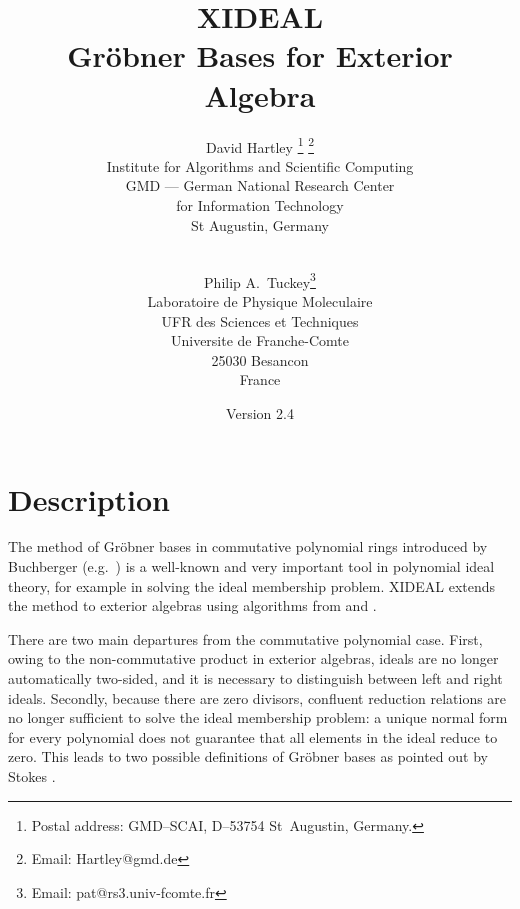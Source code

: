 
\title{\bf XIDEAL\\
Gr{\"o}bner Bases for Exterior Algebra}

\author{
David Hartley
 \thanks{Postal address: GMD--SCAI, D--53754 St~Augustin, Germany.}
 \thanks{Email: Hartley@gmd.de}				\\
Institute for Algorithms and Scientific Computing	\\
GMD --- German National Research Center			\\
for Information Technology				\\
St Augustin, Germany					\\
\\ \and
Philip A.~Tuckey\thanks{Email: pat@rs3.univ-fcomte.fr}	\\
Laboratoire de Physique Moleculaire			\\
UFR des Sciences et Techniques				\\
Universite de Franche-Comte				\\
25030 Besancon						\\
France							
}

\date{Version 2.4}


\maketitle

\section{Description}

The method of Gr{\"o}bner bases in commutative polynomial rings introduced by
Buchberger (e.g.~\cite{Buchberger}) is a well-known and very important tool
in polynomial ideal theory, for example in solving the ideal membership
problem. XIDEAL extends the method to exterior algebras using
algorithms from \cite{HT} and \cite{Apel}.

There are two main departures from the commutative polynomial case. First,
owing to the non-commutative product in exterior algebras, ideals are no
longer automatically two-sided, and it is necessary to distinguish between
left and right ideals. Secondly, because there are zero divisors, confluent
reduction relations are no longer sufficient to solve the ideal membership
problem: a unique normal form for every polynomial does not guarantee that
all elements in the ideal reduce to zero. This leads to two possible
definitions of Gr{\"o}bner bases as pointed out by Stokes \cite{Stokes}.

